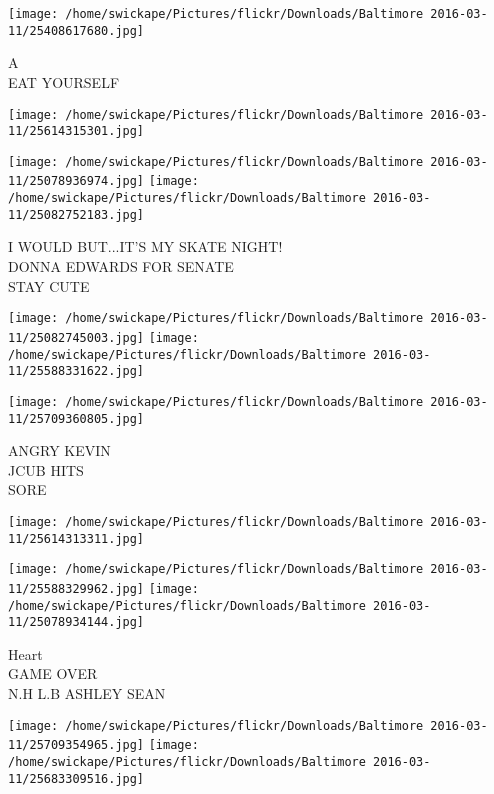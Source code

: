 \documentclass[10pt,letterpaper]{article}
\begin{document}
\vspace{0.25in}
\texttt{[image: /home/swickape/Pictures/flickr/Downloads/Baltimore 2016-03-11/25408617680.jpg]}

A\\
EAT YOURSELF\\
\pagebreak

\texttt{[image: /home/swickape/Pictures/flickr/Downloads/Baltimore 2016-03-11/25614315301.jpg]}

\vspace{0.25in}
\texttt{[image: /home/swickape/Pictures/flickr/Downloads/Baltimore 2016-03-11/25078936974.jpg]}
\texttt{[image: /home/swickape/Pictures/flickr/Downloads/Baltimore 2016-03-11/25082752183.jpg]}

I WOULD BUT...IT'S MY SKATE NIGHT!\\
DONNA EDWARDS FOR SENATE\\
STAY CUTE\\
\pagebreak

\texttt{[image: /home/swickape/Pictures/flickr/Downloads/Baltimore 2016-03-11/25082745003.jpg]}
\texttt{[image: /home/swickape/Pictures/flickr/Downloads/Baltimore 2016-03-11/25588331622.jpg]}

\texttt{[image: /home/swickape/Pictures/flickr/Downloads/Baltimore 2016-03-11/25709360805.jpg]}

ANGRY KEVIN\\
JCUB HITS\\
SORE\\
\pagebreak

\texttt{[image: /home/swickape/Pictures/flickr/Downloads/Baltimore 2016-03-11/25614313311.jpg]}

\vspace{0.25in}
\texttt{[image: /home/swickape/Pictures/flickr/Downloads/Baltimore 2016-03-11/25588329962.jpg]}
\texttt{[image: /home/swickape/Pictures/flickr/Downloads/Baltimore 2016-03-11/25078934144.jpg]}

Heart\\
GAME OVER\\
N.H L.B ASHLEY SEAN\\
\pagebreak

\texttt{[image: /home/swickape/Pictures/flickr/Downloads/Baltimore 2016-03-11/25709354965.jpg]}
\texttt{[image: /home/swickape/Pictures/flickr/Downloads/Baltimore 2016-03-11/25683309516.jpg]}
\end{document}
